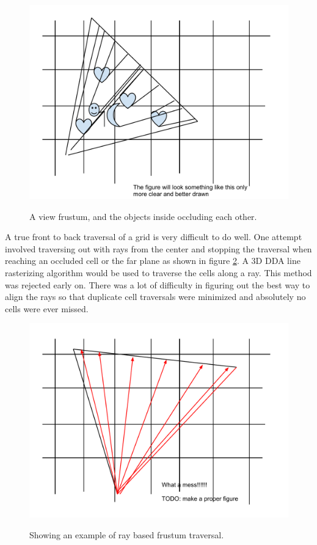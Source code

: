 \documentclass[12pt]{ucthesis}
\newcommand{\captionfonts}{\small\bf\ssp}
\begin{document}
\begin{figure}
\begin{center}
\includegraphics[width=\textwidth]{Images/frustum.pdf}
\captionfonts
\caption[View Frustum and Occluders]{A view frustum, and the objects inside occluding each other.}
\label{fig:vf-and-occluders}
\end{center}
\end{figure}

A true front to back traversal of a grid is very difficult to do well.
One attempt involved traversing out with rays from the center and stopping the traversal when reaching an occluded cell or the far plane as shown in figure \ref{fig:vf-ray-traversal}.
A 3D DDA line rasterizing algorithm would be used to traverse the cells along a ray.
This method was rejected early on.
There was a lot of difficulty in figuring out the best way to align the rays so that duplicate cell traversals were minimized and absolutely no cells were ever missed.

\begin{figure}
\begin{center}
\includegraphics[width=\textwidth]{Images/ray-traversal.pdf}
\captionfonts
\caption[Ray Based Traversal]{Showing an example of ray based frustum traversal.}
\label{fig:vf-ray-traversal}
\end{center}
\end{figure}
\end{document}
